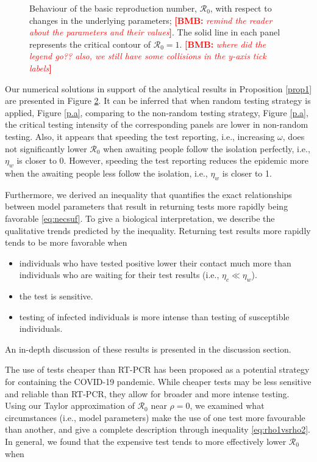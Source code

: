 \documentclass[12pt]{article}
\newcommand{\comment}{\showcomment}
\newcommand{\showcomment}[3]{\textcolor{#1}{\textbf{[#2: }\textsl{#3}\textbf{]}}}
\newcommand{\bmb}[1]{\comment{red}{BMB}{#1}}
\newcommand{\Rnum}{\mathcal{R}_0}
\theoremstyle{definition} %
\begin{document}
\begin{figure}[h!]
\begin{subfigure}[t]{.45\textwidth}
\caption{}\label{p.b}
\end{subfigure}
\caption{Behaviour of the basic reproduction number, $\Rnum$, with respect to changes in the underlying parameters; \bmb{remind the reader about the parameters and their values}. The solid line in each panel represents the critical contour of $\Rnum=1$. \bmb{where did the legend go?? also, we still have some collisions in the y-axis tick labels}}
\label{pan}
\end{figure}

Our numerical solutions in support of the analytical results in Proposition \ref{prop1} are presented in Figure \ref{pan}. It can be inferred that when random testing strategy is applied, Figure \ref{p.a}, comparing to the non-random testing strategy, Figure \ref{p.a}, the critical testing intensity of the corresponding panels are lower in non-random testing. Also, it appears that speeding the test reporting, i.e., increasing $\omega$, does not significantly lower $\Rnum$ when awaiting people follow the isolation perfectly, i.e., $\eta_w$ is closer to 0. However, speeding the test reporting reduces the epidemic more when the awaiting people less follow the isolation, i.e., $\eta_w$ is closer to 1. 

Furthermore, we derived an inequality that quantifies the exact relationships between model parameters that result in returning tests more rapidly being favorable \eqref{eq:necsuf}. To give a biological interpretation, we describe the qualitative trends predicted by the inequality. Returning test results more rapidly tends to be more favorable when

\begin{itemize}
\item individuals who have tested positive lower their contact much more than individuals who are waiting for their test results (i.e., $\eta_c \ll \eta_w$).
\item the test is sensitive.
\item testing of infected individuals is more intense than testing of susceptible individuals.
\end{itemize}
An in-depth discussion of these results is presented in the discussion section. 

The use of tests cheaper than RT-PCR has been proposed as a potential strategy for containing the COVID-19 pandemic. While cheaper tests may be less sensitive and reliable than RT-PCR, they allow for broader and more intense testing. Using our Taylor approximation of $\Rnum$ near $\rho = 0$, we examined what circumstances (i.e., model parameters) make the use of one test more favourable than another, and give a complete description through inequality \ref{eq:rho1vsrho2}. In general, we found that the expensive test tends to more effectively lower $\Rnum$ when
\end{document}
